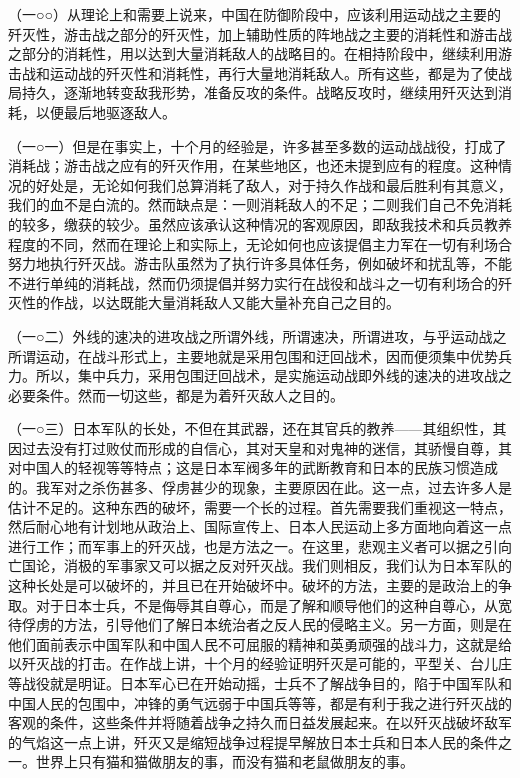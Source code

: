 \documentclass[UTF8, 12pt, a4paper]{ctexrep}
\begin{document}
（一○○）从理论上和需要上说来，中国在防御阶段中，应该利用运动战之主要的歼灭性，游击战之部分的歼灭性，加上辅助性质的阵地战之主要的消耗性和游击战之部分的消耗性，用以达到大量消耗敌人的战略目的。在相持阶段中，继续利用游击战和运动战的歼灭性和消耗性，再行大量地消耗敌人。所有这些，都是为了使战局持久，逐渐地转变敌我形势，准备反攻的条件。战略反攻时，继续用歼灭达到消耗，以便最后地驱逐敌人。

（一○一）但是在事实上，十个月的经验是，许多甚至多数的运动战战役，打成了消耗战；游击战之应有的歼灭作用，在某些地区，也还未提到应有的程度。这种情况的好处是，无论如何我们总算消耗了敌人，对于持久作战和最后胜利有其意义，我们的血不是白流的。然而缺点是：一则消耗敌人的不足；二则我们自己不免消耗的较多，缴获的较少。虽然应该承认这种情况的客观原因，即敌我技术和兵员教养程度的不同，然而在理论上和实际上，无论如何也应该提倡主力军在一切有利场合努力地执行歼灭战。游击队虽然为了执行许多具体任务，例如破坏和扰乱等，不能不进行单纯的消耗战，然而仍须提倡并努力实行在战役和战斗之一切有利场合的歼灭性的作战，以达既能大量消耗敌人又能大量补充自己之目的。

（一○二）外线的速决的进攻战之所谓外线，所谓速决，所谓进攻，与乎运动战之所谓运动，在战斗形式上，主要地就是采用包围和迂回战术，因而便须集中优势兵力。所以，集中兵力，采用包围迂回战术，是实施运动战即外线的速决的进攻战之必要条件。然而一切这些，都是为着歼灭敌人之目的。

（一○三）日本军队的长处，不但在其武器，还在其官兵的教养——其组织性，其因过去没有打过败仗而形成的自信心，其对天皇和对鬼神的迷信，其骄慢自尊，其对中国人的轻视等等特点；这是日本军阀多年的武断教育和日本的民族习惯造成的。我军对之杀伤甚多、俘虏甚少的现象，主要原因在此。这一点，过去许多人是估计不足的。这种东西的破坏，需要一个长的过程。首先需要我们重视这一特点，然后耐心地有计划地从政治上、国际宣传上、日本人民运动上多方面地向着这一点进行工作；而军事上的歼灭战，也是方法之一。在这里，悲观主义者可以据之引向亡国论，消极的军事家又可以据之反对歼灭战。我们则相反，我们认为日本军队的这种长处是可以破坏的，并且已在开始破坏中。破坏的方法，主要的是政治上的争取。对于日本士兵，不是侮辱其自尊心，而是了解和顺导他们的这种自尊心，从宽待俘虏的方法，引导他们了解日本统治者之反人民的侵略主义。另一方面，则是在他们面前表示中国军队和中国人民不可屈服的精神和英勇顽强的战斗力，这就是给以歼灭战的打击。在作战上讲，十个月的经验证明歼灭是可能的，平型关、台儿庄等战役就是明证。日本军心已在开始动摇，士兵不了解战争目的，陷于中国军队和中国人民的包围中，冲锋的勇气远弱于中国兵等等，都是有利于我之进行歼灭战的客观的条件，这些条件并将随着战争之持久而日益发展起来。在以歼灭战破坏敌军的气焰这一点上讲，歼灭又是缩短战争过程提早解放日本士兵和日本人民的条件之一。世界上只有猫和猫做朋友的事，而没有猫和老鼠做朋友的事。
\end{document}
